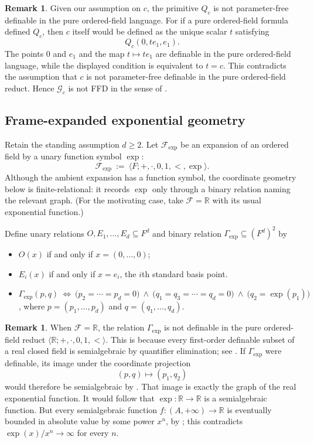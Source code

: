 \documentclass[11pt,a4paper]{article}
\newcommand{\G}{\mathcal{G}}
\newcommand{\F}{\mathcal{F}}
\theoremstyle{definition}
\newtheorem{remark}[theorem]{Remark}
\begin{document}
\begin{remark}
	\label{rem:8.2}
Given our assumption on $c$, the
primitive $Q_c$ is not parameter-free definable in the pure
ordered-field language. For if a pure ordered-field formula defined
$Q_c$, then $c$ itself would be defined as the unique scalar $t$
satisfying \[
Q_c(0,t e_1,e_1).
\] The points $0$ and $e_1$ and the map $t\mapsto t e_1$ are
definable in the pure ordered-field language, while the displayed
condition is equivalent to $t=c$. This contradicts the assumption that
$c$ is not parameter-free definable in the pure ordered-field reduct.
Hence $\G_c$ is not FFD in the sense of \cite{MSS26}.
\end{remark}



\subsection{Frame-expanded exponential geometry}
\label{sec:8.2}

Retain the standing assumption $d\ge 2$. Let $\F_{\exp}$ be an expansion of an ordered field by a unary
function symbol $\exp$:
\[
\F_{\exp}\ :=\ \langle F; +,\cdot,0,1,<,\exp\rangle .
\]
Although the ambient expansion has a function symbol, the coordinate geometry
below is finite-relational: it records $\exp$ only through a binary relation
naming the relevant graph. (For the motivating case, take $\F=\mathbb R$ with its usual
exponential function.)

Define unary relations $O,E_1,\dots,E_d\subseteq F^d$ and binary relation $\Gamma_{\exp}\subseteq (F^d)^2$  by
\begin{itemize}[leftmargin=2em]
\item $O(x)$ if and only if $x=(0,\dots,0)$;
\item $E_i(x)$ if and only if $x=e_i$, the $i$th standard basis point.
\item $\Gamma_{\exp}(p,q)\ \iff\ \big(p_2=\cdots=p_d=0\big)\ \wedge\ \big(q_1=q_3=\cdots=q_d=0\big)\ \wedge\ \big(q_2=\exp(p_1)\big)$, where $p=(p_1,\dots,p_d)$ and $q=(q_1,\dots,q_d)$.
\end{itemize}


\begin{remark}
	\label{rem:8.3}
When
$\F=\mathbb R$, the relation $\Gamma_{\exp}$ is not definable in the
pure ordered-field reduct $\langle \mathbb R;+ ,\cdot,0,1,<\rangle$.
This is because every first-order definable subset of a real closed field is
semialgebraic by quantifier elimination; see
\cite[Theorem~2.6]{Coste2002}. If $\Gamma_{\exp}$ were definable, its
image under the coordinate projection
\[
 (p,q)\longmapsto (p_1,q_2)
\]
would therefore be semialgebraic by
\cite[Corollary~2.4]{Coste2002}. That image is exactly the graph of the
real exponential function. It would follow that $\exp:\mathbb R\to
\mathbb R$ is a semialgebraic function. But every semialgebraic function
$f:(A,+\infty)\to\mathbb R$ is eventually bounded in absolute value by
some power $x^n$, by \cite[Proposition~2.11]{Coste2002}; this contradicts
$\exp(x)/x^n\to\infty$ for every $n$.
\end{remark}
\end{document}
